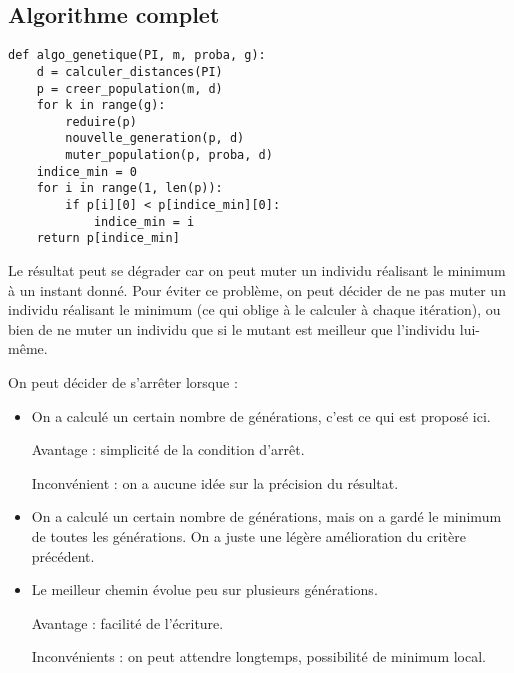 \subsection{Algorithme complet}
\begin{Exercise}[title = {\bf III.E.1)}]
\begin{lstlisting}
def algo_genetique(PI, m, proba, g):
    d = calculer_distances(PI)
    p = creer_population(m, d)
    for k in range(g): 
	    reduire(p)
	    nouvelle_generation(p, d)
	    muter_population(p, proba, d)
	indice_min = 0
    for i in range(1, len(p)):
        if p[i][0] < p[indice_min][0]:
            indice_min = i
    return p[indice_min]
\end{lstlisting}
\end{Exercise}
\begin{Exercise}[title = {\bf III.E.2)}]
Le résultat peut se dégrader car on peut muter un individu réalisant le minimum à un instant donné. Pour éviter ce problème, on peut décider de ne pas muter un individu réalisant le minimum (ce qui oblige à le calculer à chaque itération), ou bien de ne muter un individu que si le mutant est meilleur que l'individu lui-même.
\end{Exercise}
\begin{Exercise}[title = {\bf III.E.3)}]
On peut décider de s'arrêter lorsque :
\begin{itemize}
\item On a calculé un certain nombre de générations, c'est ce qui est proposé ici. 

Avantage : simplicité de la condition d'arrêt. 

Inconvénient : on a aucune idée sur la précision du résultat.

\item On a calculé un certain nombre de générations, mais on a gardé le minimum de toutes les générations. On a juste une légère amélioration du critère précédent. 

\item Le meilleur chemin évolue peu sur plusieurs générations. 

Avantage : facilité de l'écriture. 

Inconvénients : on peut attendre longtemps, possibilité de minimum local. 
\end{itemize}
\end{Exercise}
